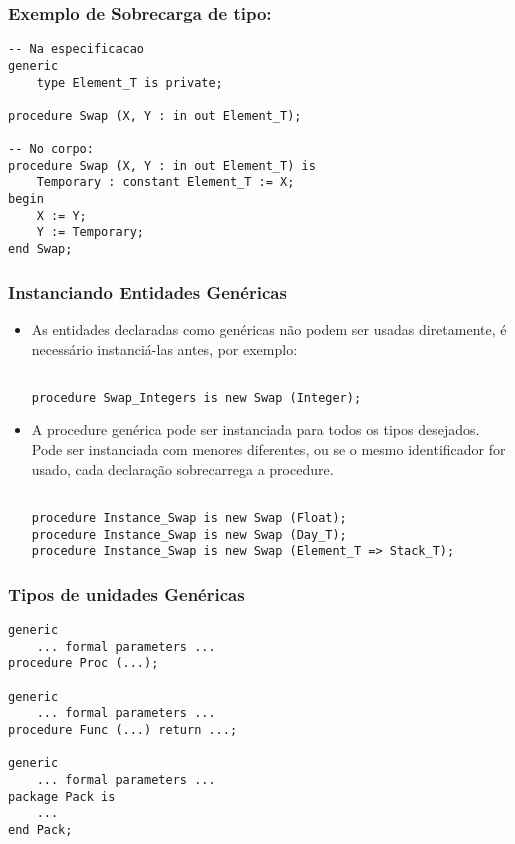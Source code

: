 \documentclass{beamer}
\begin{document}
    \begin{frame}[containsverbatim]
        \frametitle{Exemplo de Sobrecarga de tipo:}
        \begin{verbatim}
-- Na especificacao
generic
    type Element_T is private;

procedure Swap (X, Y : in out Element_T);

-- No corpo:
procedure Swap (X, Y : in out Element_T) is
    Temporary : constant Element_T := X;
begin
    X := Y;
    Y := Temporary;
end Swap;
        \end{verbatim}
    \end{frame}

    \begin{frame}[containsverbatim]
        \frametitle{Instanciando Entidades Genéricas}
        \begin{itemize}
            \item<1-> As entidades declaradas como genéricas não podem ser
            usadas diretamente, é necessário instanciá-las antes, por exemplo:
            \begin{verbatim}

procedure Swap_Integers is new Swap (Integer);

            \end{verbatim}
            \item<2-> A procedure genérica pode ser instanciada para todos os
            tipos desejados. Pode ser instanciada com menores diferentes, ou se
            o mesmo identificador for usado, cada declaração sobrecarrega a
            procedure.
            \begin{verbatim}

procedure Instance_Swap is new Swap (Float);
procedure Instance_Swap is new Swap (Day_T);
procedure Instance_Swap is new Swap (Element_T => Stack_T);

            \end{verbatim}
        \end{itemize}
    \end{frame}

    \begin{frame}[containsverbatim]
        \frametitle{Tipos de unidades Genéricas}
        \begin{verbatim}
generic
    ... formal parameters ...
procedure Proc (...);

generic
    ... formal parameters ...
procedure Func (...) return ...;

generic
    ... formal parameters ...
package Pack is
    ...
end Pack;
        \end{verbatim}
    \end{frame}
\end{document}
